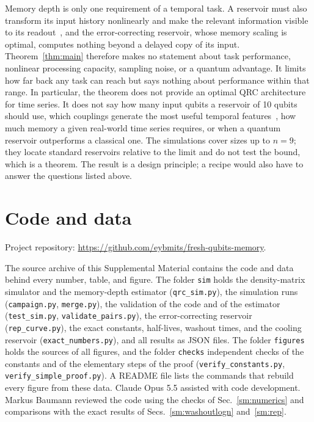 \documentclass[aps,prl,twocolumn,superscriptaddress,floatfix]{revtex4-2}
\theoremstyle{plain}
\begin{document}
Memory depth is only one requirement of a temporal task. A reservoir must also transform its input history nonlinearly and make the relevant information visible to its readout~\cite{Cao2026}, and the error-correcting reservoir, whose memory scaling is optimal, computes nothing beyond a delayed copy of its input. Theorem~\ref{thm:main} therefore makes no statement about task performance, nonlinear processing capacity, sampling noise, or a quantum advantage. It limits how far back any task can reach but says nothing about performance within that range. In particular, the theorem does not provide an optimal QRC architecture for time series. It does not say how many input qubits a reservoir of 10 qubits should use, which couplings generate the most useful temporal features~\cite{MartinezPena2021,Cao2026}, how much memory a given real-world time series requires, or when a quantum reservoir outperforms a classical one. The simulations cover sizes up to $n=9$; they locate standard reservoirs relative to the limit and do not test the bound, which is a theorem. The result is a design principle; a recipe would also have to answer the questions listed above.

\section{Code and data}
\label{sm:code}

Project repository: \url{https://github.com/eybmits/fresh-qubits-memory}.

The source archive of this Supplemental Material contains the code and data behind every number, table, and figure. The folder \texttt{sim} holds the density-matrix simulator and the memory-depth estimator (\texttt{qrc\_sim.py}), the simulation runs (\texttt{campaign.py}, \texttt{merge.py}), the validation of the code and of the estimator (\texttt{test\_sim.py}, \texttt{validate\_pairs.py}), the error-correcting reservoir (\texttt{rep\_curve.py}), the exact constants, half-lives, washout times, and the cooling reservoir (\texttt{exact\_numbers.py}), and all results as JSON files. The folder \texttt{figures} holds the sources of all figures, and the folder \texttt{checks} independent checks of the constants and of the elementary steps of the proof (\texttt{verify\_constants.py}, \texttt{verify\_simple\_proof.py}). A README file lists the commands that rebuild every figure from these data. Claude Opus 5.5 assisted with code development. Markus Baumann reviewed the code using the checks of Sec.~\ref{sm:numerics} and comparisons with the exact results of Secs.~\ref{sm:washoutlogn} and~\ref{sm:rep}.
\end{document}
